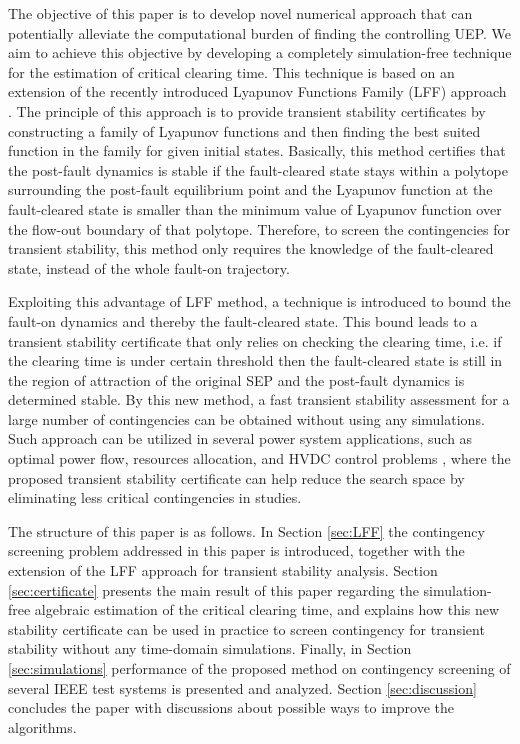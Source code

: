 \documentclass[final]{IEEEtran}
\begin{document}
The objective of this paper is to develop novel numerical approach
that can potentially alleviate the computational burden of finding
the controlling UEP. We aim to achieve this objective by
developing a completely simulation-free technique for the
estimation of critical clearing time. This technique is based on
an extension of the recently introduced  Lyapunov Functions Family
(LFF) approach \cite{Vu:2014}. The principle of this approach is
to provide transient stability certificates by constructing a
family of Lyapunov functions and then finding the best suited
function in the family for given initial states. Basically, this
method certifies that the post-fault dynamics is stable if the
fault-cleared state stays within a polytope surrounding the
post-fault equilibrium point and the Lyapunov function at the
fault-cleared state is smaller than the minimum value of Lyapunov
function over the flow-out boundary of that polytope. Therefore,
to screen the contingencies for transient stability, this method
only requires the knowledge of the fault-cleared state, instead of
the whole fault-on trajectory.

Exploiting this advantage of LFF method, a technique is introduced
to bound the fault-on dynamics and thereby the fault-cleared
state. This bound leads to a transient stability certificate that
only relies on checking the clearing time, i.e. if the clearing
time is under certain threshold then the fault-cleared state is
still in the region of attraction of the original SEP and
 the post-fault dynamics
is determined stable. By this new method, a fast transient
stability assessment for a large number of contingencies can be
obtained without using any simulations. Such approach can be
utilized in several power system applications, such as optimal
power flow, resources allocation, and HVDC control problems
\cite{4487649, 6575172,
6887372,6755588,6837516,6194234,6629400,6315377}, where the
proposed transient stability certificate can help reduce the
search space by eliminating less critical contingencies in
studies.


The structure of this paper is as follows. In Section
\ref{sec:LFF} the contingency screening problem addressed in this
paper is introduced, together with the extension of the LFF
approach for transient stability analysis. Section
\ref{sec:certificate} presents the main result of this paper
regarding the simulation-free algebraic estimation of the critical
clearing time, and explains how this new stability certificate can
be used in practice to screen contingency for transient stability
without any time-domain simulations. Finally, in Section
\ref{sec:simulations} performance of the proposed method on
contingency screening of several IEEE test systems is presented
and analyzed. Section \ref{sec:discussion} concludes the paper
with discussions about possible ways to improve the algorithms.
\end{document}
